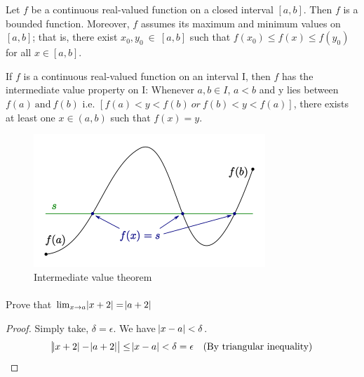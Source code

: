 \documentclass{notes}
\begin{document}
\begin{theorem}{}
	Let $f$ be a continuous real-valued function on a closed interval $[a, b]$.
	Then $f$ is a bounded function. Moreover, $f$ assumes its maximum
	and minimum values on $[a, b]$; that is, there exist $ x_0, y_0\ \in \ [a, b]$ such
	that $f(x_0) \leq f(x) \leq f(y_0)$ for all $x \in [a, b]$.
\end{theorem}

\begin{theorem}{}
	If $f$ is a continuous real-valued function on an interval I, then $f$ has
	the intermediate value property on I: Whenever $a, b \in I$, $a<b$ and y
	lies between $f(a)\ \text{and}\ f(b)$ i.e. $[f(a) < y <f(b)\ or\  f(b) <y<f(a)]$,
	there exists at least one $x \in (a, b)$ such that $f(x) = y$.
	
	
\end{theorem}
\begin{figure}[h!]  %
	\begin{center}
		\includegraphics[]{resources/intermediate.png}
		\caption{Intermediate value theorem}
	\end{center}
\end{figure}
\paragraph{}
\begin{problem}
	Prove that $\lim_{x \to a} \abs{x+2} = \abs{a+2}$
\end{problem}
\begin{proof}
	Simply take, $ \delta = \epsilon$. We have $ \abs{x - a} < \delta$.
	$$ 
	\abs{\abs{x+2}-\abs{a+2}} \leq \abs{x - a}     < \delta  = \epsilon \quad \text{(By triangular inequality)}$$
\end{proof}
\end{document}
